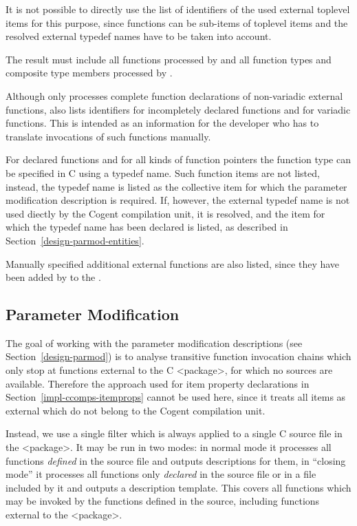 It is not possible to directly use the list of identifiers of the used external toplevel items for this purpose, since 
functions can be sub-items of toplevel items and the resolved external typedef names have to be taken into account.

The result must include all functions processed by  and all function types and composite type members
processed by . 

Although  only processes complete function declarations of non-variadic external functions, 
 also lists identifiers for incompletely declared functions and for variadic functions.
This is intended as an information for the developer who has to translate invocations of such functions manually.

For declared functions and for all kinds of function pointers the function type can be specified in C using a typedef name.
Such function items are not listed, instead, the typedef name is listed as the collective item for which the parameter
modification description is required. If, however, the external typedef name is not used diectly by the Cogent compilation
unit, it is resolved, and the item for which the typedef name has been declared is listed, as described in 
Section~\ref{design-parmod-entities}.

Manually specified additional external functions are also listed, since they have been added by 
to the .

\subsection{Parameter Modification}
\label{impl-ccomps-parmod}

The goal of working with the parameter modification descriptions (see Section~\ref{design-parmod}) is to analyse 
transitive function invocation chains which only stop at functions external to the C <package>, for which no sources
are available. Therefore the approach used for item property declarations in Section~\ref{impl-ccomps-itemprops}
cannot be used here, since it treats all items as external which do not belong to the Cogent compilation unit.

Instead, we use a single filter  which is always applied to a single C source file in the 
<package>. It may be run in two modes: in normal mode it processes all functions \textit{defined} in the source
file and outputs descriptions for them, in ``closing mode'' it processes all functions only \textit{declared} in 
the source file or in a file included by it and outputs a description template. This covers all functions which 
may be invoked by the functions defined in the source, including functions external to the <package>. 

